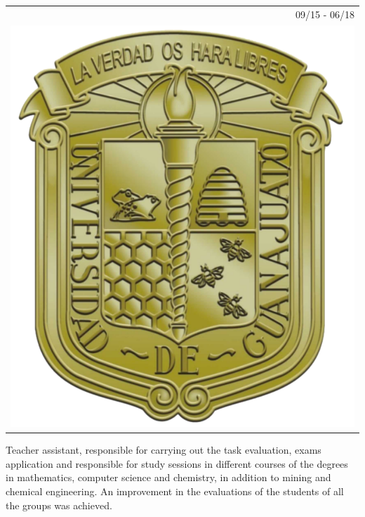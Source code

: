 \documentclass[]{friggeri-cv}
\begin{document}
\begin{entrylist}
  \entry
    {   \begin{tabular}{r}
    		09/15 - 06/18\\
     		\hspace{0.9cm}\includegraphics[scale=0.5]{img/UGTO.png}
	\end{tabular}
    }
    {\vspace{-1.51cm}}
    { }
    {Teacher assistant, responsible for carrying out the task evaluation, exams application and responsible for study sessions in different courses of the degrees in mathematics, computer science and chemistry, in addition to mining and chemical engineering. An improvement in the evaluations of the students of all the groups was achieved.}
\end{entrylist}
    \newpage
\end{document}
